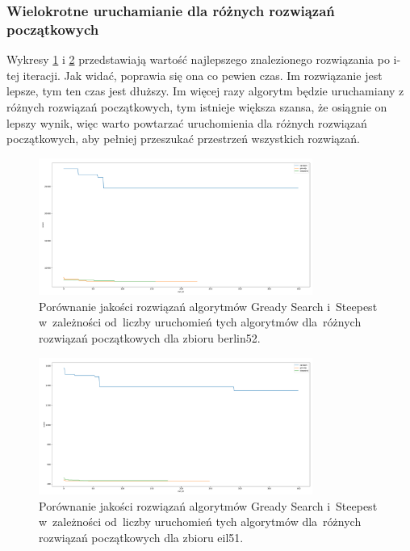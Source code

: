 \subsubsection{Wielokrotne uruchamianie dla różnych rozwiązań początkowych}

Wykresy \ref{fig:more_berlin} i \ref{fig:more_eil} przedstawiają wartość najlepszego znalezionego rozwiązania po i-tej iteracji. Jak widać, poprawia się ona co pewien czas. Im rozwiązanie jest lepsze, tym ten czas jest dłuższy. Im więcej razy algorytm będzie uruchamiany z różnych rozwiązań początkowych, tym istnieje większa szansa, że osiągnie on lepszy wynik, więc warto powtarzać uruchomienia dla różnych rozwiązań początkowych, aby pełniej przeszukać przestrzeń wszystkich rozwiązań.

\begin{figure}
\begin{center}
\includegraphics[width=0.8\textwidth]{graphs/multi_start_scoreberlin52.pdf}
\end{center}
\caption{Porównanie jakości rozwiązań algorytmów Gready Search i~Steepest w~zależności od~liczby uruchomień tych algorytmów dla~różnych rozwiązań początkowych dla zbioru berlin52.}
\label{fig:more_berlin}
\end{figure}

\begin{figure}
\begin{center}
\includegraphics[width=0.8\textwidth]{graphs/multi_start_scoreeil51.pdf}
\end{center}
\caption{Porównanie jakości rozwiązań algorytmów Gready Search i~Steepest w~zależności od~liczby uruchomień tych algorytmów dla~różnych rozwiązań początkowych dla zbioru eil51.}
\label{fig:more_eil}
\end{figure}


